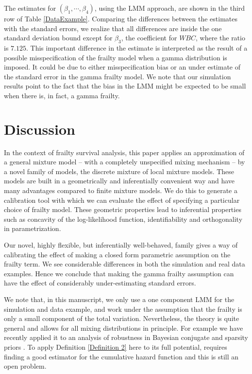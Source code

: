 \documentclass[graybox]{svmult}
\begin{document}
The estimates for  $(\beta_1,\cdots,\beta_4)$, using the LMM approach, are shown in the third row of Table \ref{DataExample}. 
 Comparing the differences between the
estimates with the standard errors, we realize that all differences are inside the one standard deviation bound
except for $\beta_3$, the coefficient for $WBC$, where the ratio is $7.125$. This important difference in the estimate
is interpreted as the result of a possible misspecification of the frailty model when a gamma distribution is imposed. It could be due to either misspecification bias or an under estimate of the standard error in the gamma frailty model. We note that our simulation results point to the fact that the bias in the LMM might be expected to be small when there is, in fact, a gamma frailty. 



\section{Discussion}\label{Summary}
In the context of  frailty survival analysis, this paper applies an approximation of a general mixture model -- with a completely unspecified mixing mechanism  -- by a
novel family of models, the discrete mixture of local mixture models.
These models are built in a geometrically and inferentially convenient way and have many advantages compared to 
finite mixture models. We do this to generate a calibration tool with which we can evaluate the effect of specifying a particular choice of frailty model. These geometric properties lead to inferential
properties such as concavity of the log-likelihood function, identifiability and orthogonality in parametrization.


Our novel,  highly flexible, but inferentially well-behaved,  family gives a way of calibrating the effect of making a closed form parametric
assumption on the frailty term. We see  considerable differences in both the simulation and real data examples.  Hence we conclude that
 making  the gamma frailty assumption can have  the effect of considerably under-estimating standard errors.

{We note that, in this manuscript, we only use a one component LMM for the simulation and data example, and work under the assumption that the frailty is only  a small component of the total variation. Nevertheless, the theory is quite general and allows for all mixing  distributions in principle. For example we have recently applied it to an analysis of  robustness in Bayesian conjugate and sparsity priors \cite{Maroufya}. To apply Definition \ref{Definition 2} here to  its full potential, requires finding a good estimator for the cumulative hazard function  and this is still an open problem. }    
\end{document}
